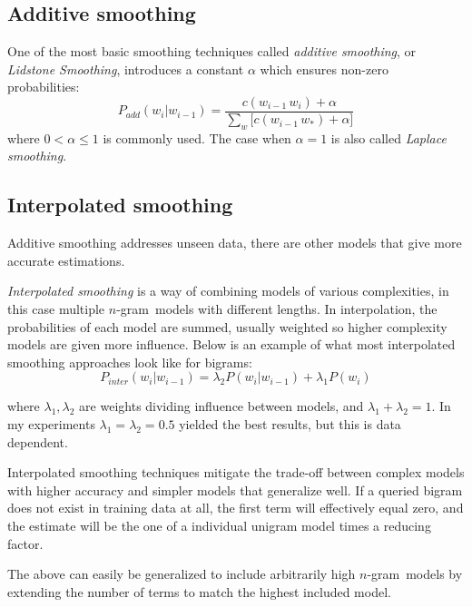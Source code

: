 \documentclass[a4paper,11pt]{kth-mag}
\newcommand{\ngram}{$n$-gram}
\begin{document}
\subsection{Additive smoothing}
One of the most basic smoothing techniques called \emph{additive smoothing},
or \emph{Lidstone Smoothing}, introduces a constant $\alpha$ which ensures
non-zero probabilities\cite{chen_goodman}:
\begin{equation} \label{eq:additive_smoothing}
P_{add}(w_i|w_{i-1}) = \frac{c(w_{i-1}\,w_i)+\alpha}{\sum_{w} \big[c(w_{i-1}\, w_*)+\alpha\big]}
\end{equation}
where $0 < \alpha \leq 1$ is commonly used. The case when $\alpha=1$ is also called \emph{Laplace smoothing}\cite{nlp_book}.


\subsection{Interpolated smoothing}
Additive smoothing addresses unseen data, there are other models that give more accurate estimations.

\emph{Interpolated smoothing} is a way of combining models of various complexities,
in this case multiple \ngram~models with different lengths. In interpolation, the probabilities of each model are summed, usually weighted so higher complexity models are given more influence\cite{chen_goodman}.
Below is an example of what most interpolated smoothing approaches look like for bigrams:
\begin{equation}\label{eq:interpolated_smoothing}
  P_{inter}(w_i|w_{i-1}) =
  \lambda_2 P(w_i|w_{i-1}) + \lambda_1 P(w_i)
\end{equation}

where $\lambda_1, \lambda_2$ are weights dividing influence between models, and $\lambda_1 + \lambda_2 = 1$.
In my experiments $\lambda_1 = \lambda_2 = 0.5$ yielded the best results, but this is data dependent.

Interpolated smoothing techniques mitigate the trade-off between complex models with higher accuracy and simpler models that generalize well. If a queried bigram does not exist in training data at all, the first term will effectively equal zero, and the estimate will be the one of a individual unigram model times a reducing factor.

The above can easily be generalized to include arbitrarily high \ngram~models by extending the number of terms to match the highest included model.
\end{document}
